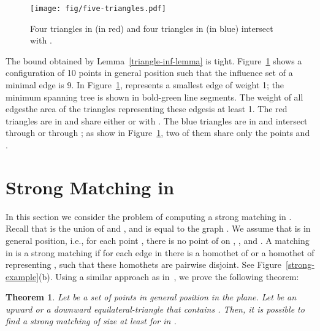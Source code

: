 \documentclass[11pt,a4paper]{article}
\newtheorem{theorem}{Theorem}
\begin{document}
\begin{figure}[htb]
  \centering
\texttt{[image: fig/five-triangles.pdf]}
  \caption{Four triangles in  (in red) and four triangles in  (in blue) intersect with .}
\label{five-fig}
\end{figure}

The bound obtained by Lemma~\ref{triangle-inf-lemma} is tight. Figure~\ref{five-fig} shows a configuration of 10 points in general position such that the influence set of a minimal edge is 9. In Figure~\ref{five-fig},  represents a smallest edge of weight 1; the minimum spanning tree is shown in bold-green line segments. The weight of all edges\textemdash the area of the triangles representing these edges\textemdash is at least 1. The red triangles are in  and share either  or  with . The blue triangles are in  and intersect  through  or through ; as show in Figure~\ref{five-fig}, two of them share only the points  and .

\section{Strong Matching in }

In this section we consider the problem of computing a strong matching in . Recall that  is the union of  and , and is equal to the graph . We assume that  is in general position, i.e., for each point , there is no point of  on , , and . A matching  in  is a strong matching if for each edge  in  there is a homothet of  or a homothet of  representing , such that these homothets are pairwise disjoint. See Figure~\ref{strong-example}(b). Using a similar approach as in~\cite{Abrego2009}, we prove the following theorem:

\label{theta-six-section}
\begin{theorem}
\label{theta-six-thr}
Let  be a set of  points in general position in the plane. Let  be an upward or a downward equilateral-triangle that contains . Then, it is possible to find a strong matching of size at least  for  in .
\end{theorem}
\end{document}
